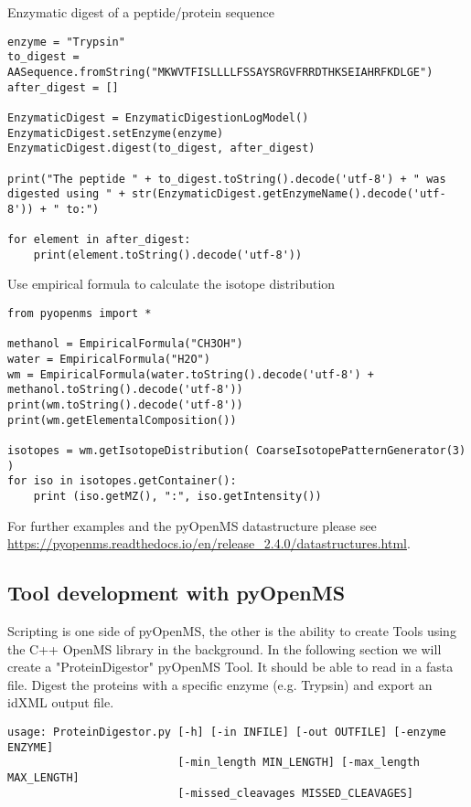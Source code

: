 {\noindent Enzymatic digest of a peptide/protein sequence 
\begin{lstlisting}
enzyme = "Trypsin"
to_digest = AASequence.fromString("MKWVTFISLLLLFSSAYSRGVFRRDTHKSEIAHRFKDLGE")
after_digest = []

EnzymaticDigest = EnzymaticDigestionLogModel()
EnzymaticDigest.setEnzyme(enzyme)
EnzymaticDigest.digest(to_digest, after_digest)

print("The peptide " + to_digest.toString().decode('utf-8') + " was digested using " + str(EnzymaticDigest.getEnzymeName().decode('utf-8')) + " to:")

for element in after_digest:
    print(element.toString().decode('utf-8'))
\end{lstlisting}

\noindent Use empirical formula to calculate the isotope distribution 
\begin{lstlisting}
from pyopenms import *

methanol = EmpiricalFormula("CH3OH")
water = EmpiricalFormula("H2O")
wm = EmpiricalFormula(water.toString().decode('utf-8') + methanol.toString().decode('utf-8'))
print(wm.toString().decode('utf-8'))
print(wm.getElementalComposition())

isotopes = wm.getIsotopeDistribution( CoarseIsotopePatternGenerator(3) )
for iso in isotopes.getContainer():
    print (iso.getMZ(), ":", iso.getIntensity())
\end{lstlisting}

\noindent For further examples and the pyOpenMS datastructure please see \url{https://pyopenms.readthedocs.io/en/release_2.4.0/datastructures.html}. 

\subsection{Tool development with pyOpenMS}
Scripting is one side of pyOpenMS, the other is the ability to create Tools using the C++ OpenMS library in the background.  In the following section we will create a "ProteinDigestor" pyOpenMS Tool. It should be able to read in a fasta file. Digest the proteins with a specific enzyme (e.g. Trypsin) and export an idXML output file.

\begin{lstlisting}
usage: ProteinDigestor.py [-h] [-in INFILE] [-out OUTFILE] [-enzyme ENZYME]
                          [-min_length MIN_LENGTH] [-max_length MAX_LENGTH]
                          [-missed_cleavages MISSED_CLEAVAGES]


\end{lstlisting}}

